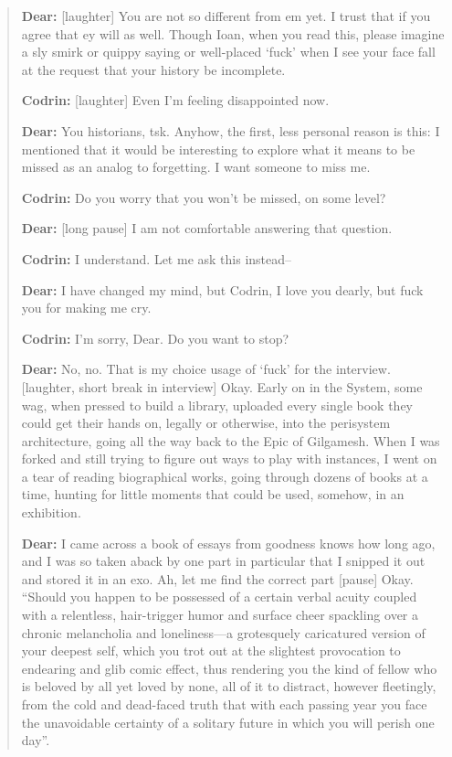 \begin{quote}
\textbf{Dear:} {[}laughter{]} You are not so different from em yet. I trust that if you agree that ey will as well. Though Ioan, when you read this, please imagine a sly smirk or quippy saying or well-placed `fuck' when I see your face fall at the request that your history be incomplete.

\textbf{Codrin:} {[}laughter{]} Even I'm feeling disappointed now.

\textbf{Dear:} You historians, tsk. Anyhow, the first, less personal reason is this: I mentioned that it would be interesting to explore what it means to be missed as an analog to forgetting. I want someone to miss me.

\textbf{Codrin:} Do you worry that you won't be missed, on some level?

\textbf{Dear:} {[}long pause{]} I am not comfortable answering that question.

\textbf{Codrin:} I understand. Let me ask this instead--

\textbf{Dear:} I have changed my mind, but Codrin, I love you dearly, but fuck you for making me cry.

\textbf{Codrin:} I'm sorry, Dear. Do you want to stop?

\textbf{Dear:} No, no. That is my choice usage of `fuck' for the interview. {[}laughter, short break in interview{]} Okay. Early on in the System, some wag, when pressed to build a library, uploaded every single book they could get their hands on, legally or otherwise, into the perisystem architecture, going all the way back to the Epic of Gilgamesh. When I was forked and still trying to figure out ways to play with instances, I went on a tear of reading biographical works, going through dozens of books at a time, hunting for little moments that could be used, somehow, in an exhibition.

\textbf{Dear:} I came across a book of essays from goodness knows how long ago, and I was so taken aback by one part in particular that I snipped it out and stored it in an exo. Ah, let me find the correct part {[}pause{]} Okay. ``Should you happen to be possessed of a certain verbal acuity coupled with a relentless, hair-trigger humor and surface cheer spackling over a chronic melancholia and loneliness---a grotesquely caricatured version of your deepest self, which you trot out at the slightest provocation to endearing and glib comic effect, thus rendering you the kind of fellow who is beloved by all yet loved by none, all of it to distract, however fleetingly, from the cold and dead-faced truth that with each passing year you face the unavoidable certainty of a solitary future in which you will perish one day''.


\end{quote}
